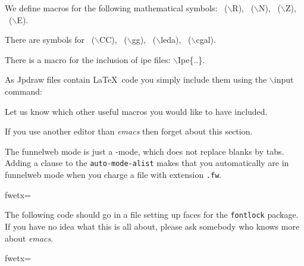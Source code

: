 \documentclass[]{article}
\begin{document}

We define macros for the following mathematical symbols: \R\ ($\backslash$R),
\N\ ($\backslash$N), \Z\ ($\backslash$Z), \E\ ($\backslash$E).

There are symbols for \CC\ ($\backslash$CC), \gg\ ($\backslash$gg),
\leda\ ($\backslash$leda), \cgal\ ($\backslash$cgal).

There is a macro for the inclusion of ipe files: $\backslash$Ipe\{..\}.

\medskip
\centerline{}

\medskip


As {\sc Jpdraw} files contain \LaTeX\ code you simply include them using
the $\backslash$input command:

\begin{center}

\end{center}

Let us know which other useful macros you would like to have included.


If you use another editor than {\it emacs} then forget about this section.


The funnelweb mode is just a \CC -mode, which does not replace
blanks by tabs.   Adding a clause to the {\tt auto-mode-alist}
makes that you automatically are in funnelweb mode when you
charge a file with extension {\tt .fw}.

\fwbeginmacro
{}\fwequals \fwodef {}fwetx=%
\fwcdef 
\fwbeginmacronotes
{}
\fwendmacronotes
\fwendmacro



The following  code should go in a file setting up faces for
the {\tt fontlock} package. If you have no idea what this is all about,
please ask somebody who knows more about {\it emacs}.

\fwbeginmacro
{}\fwequals \fwodef {}fwetx=%
\fwcdef 
\fwbeginmacronotes
{}
\fwendmacronotes
\fwendmacro
\end{document}
